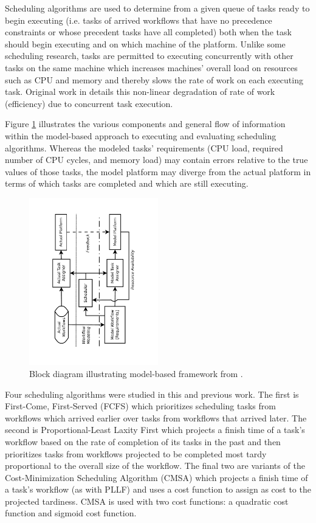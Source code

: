 \documentclass[10pt]{csce}
\begin{document}
Scheduling algorithms are used to determine from a given queue of tasks
ready to begin executing (i.e. tasks of arrived workflows that have no
precedence constraints or whose precedent tasks have all completed) both
when the task should begin executing and on which machine of the platform.
Unlike some scheduling research, tasks are permitted to executing concurrently
with other tasks on the same machine which increases machines' overall load
on resources such as CPU and memory and thereby slows the rate of work on each
executing task.  Original work in \cite{pdpta09} details this non-linear
degradation of rate of work (efficiency) due to concurrent task execution.

Figure \ref{fig:platform} illustrates the various components and general
flow of information within the model-based approach to executing and evaluating
scheduling algorithms.  Whereas the modeled tasks' requirements (CPU load,
required number of CPU cycles, and memory load) may contain errors relative to
the true values of those tasks, the model platform may diverge from the
actual platform in terms of which tasks are completed and which are still
executing.

\begin{figure}
	\begin{center}
		\includegraphics[angle=-90,width=0.5\textwidth]{figures/PlatformDiagram.pdf}
	\end{center}
	\caption{Block diagram illustrating model-based framework from
		\cite{pdpta18}.}
	\label{fig:platform}
\end{figure}

Four scheduling algorithms were studied in this and previous work.  The first
is First-Come, First-Served (FCFS) which prioritizes scheduling tasks from
workflows which arrived earlier over tasks from workflows that arrived later.
The second is Proportional-Least Laxity First which projects a finish time
of a task's workflow based on the rate of completion of its tasks in the past
and then prioritizes tasks from workflows projected to be completed most tardy
proportional to the overall size of the workflow.  The final two are variants
of the Cost-Minimization Scheduling Algorithm (CMSA) \cite{costmin} which
projects a finish time of a task's workflow (as with PLLF) and uses a cost
function to assign as cost to the projected tardiness.  CMSA is used with two
cost functions: a quadratic cost function and sigmoid cost function.
\end{document}
